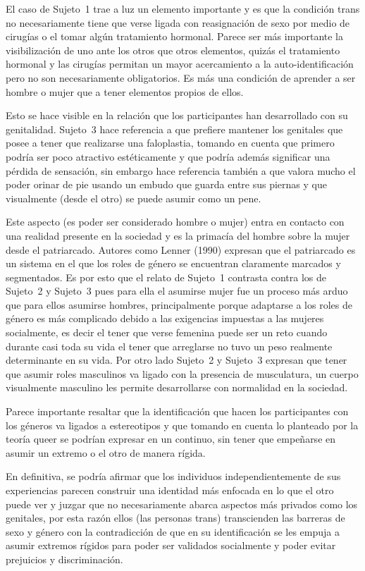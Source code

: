 El caso de Sujeto~1 trae a luz un elemento importante y es que la condición
trans no necesariamente tiene que verse ligada con reasignación de sexo por
medio de cirugías o el tomar algún tratamiento hormonal. Parece ser más
importante la visibilización de uno ante los otros que otros elementos, quizás
el tratamiento hormonal y las cirugías permitan un mayor acercamiento a la
auto-identificación pero no son necesariamente obligatorios. Es más una
condición de aprender a ser hombre o mujer que a tener elementos propios de
ellos.

Esto se hace visible en la relación que los participantes han desarrollado con
su genitalidad. Sujeto~3 hace referencia a que prefiere mantener los genitales
que posee a tener que realizarse una faloplastia, tomando en cuenta que primero
podría ser poco atractivo estéticamente y que podría además significar una
pérdida de sensación, sin embargo hace referencia también a que valora mucho el
poder orinar de pie usando un embudo que guarda entre sus piernas y que
visualmente (desde el otro) se puede asumir como un pene.

Este aspecto (es poder ser considerado hombre o mujer) entra en contacto con una
realidad presente en la sociedad y es la primacía del hombre sobre la mujer
desde el patriarcado. Autores como Lenner (1990) expresan que el patriarcado es
un sistema en el que los roles de género se encuentran claramente marcados y
segmentados. Es por esto que el relato de Sujeto~1 contrasta contra los de
Sujeto~2 y Sujeto~3 pues para ella el asumirse mujer fue un proceso más arduo
que para ellos asumirse hombres, principalmente porque adaptarse a los roles de
género es más complicado debido a las exigencias impuestas a las mujeres
socialmente, es decir el tener que verse femenina puede ser un reto cuando
durante casi toda su vida el tener que arreglarse no tuvo un peso realmente
determinante en su vida. Por otro lado Sujeto~2 y Sujeto~3 expresan que tener
que asumir roles masculinos va ligado con la presencia de musculatura, un cuerpo
visualmente masculino les permite desarrollarse con normalidad en la sociedad.

Parece importante resaltar que la identificación que hacen los participantes con
los géneros va ligados a estereotipos y que tomando en cuenta lo planteado por
la teoría queer se podrían expresar en un continuo, sin tener que empeñarse en
asumir un extremo o el otro de manera rígida.

En definitiva, se podría afirmar que los individuos independientemente de sus
experiencias parecen construir una identidad más enfocada en lo que el otro
puede ver y juzgar que no necesariamente abarca aspectos más privados como los
genitales,  por esta razón ellos (las personas trans) transcienden las barreras
de sexo y género con la contradicción de que en su identificación se les empuja
a asumir extremos rígidos para poder ser validados socialmente y poder evitar
prejuicios y discriminación.

